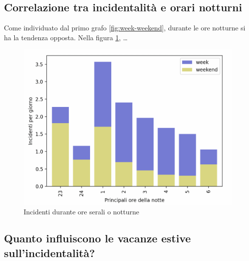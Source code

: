 \documentclass[a4paper]{report}
\begin{document}

\subsection{Correlazione tra incidentalità e orari notturni}

Come individuato dal primo grafo \ref{fig:week-weekend}, durante le 
ore notturne si ha la tendenza opposta.
Nella figura \ref{fig:ore-notte}, \dots


\begin{figure}
    \includegraphics[width=\linewidth]{../src/incidenti/incidenti_senza_coords/ore_punta/ore_notte.png}
    \caption{Incidenti durante ore serali o notturne}
    \label{fig:ore-notte}
\end{figure}


\subsection{Quanto influiscono le vacanze estive sull'incidentalità?}
\end{document}

